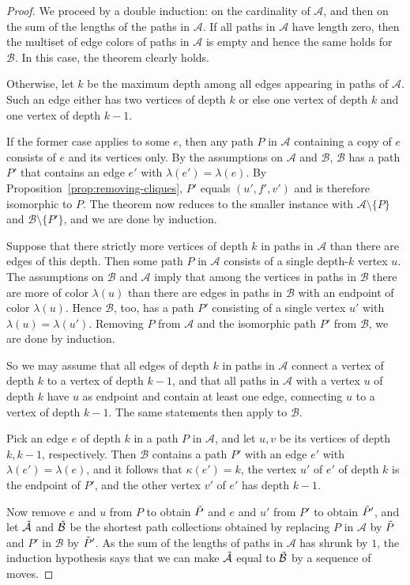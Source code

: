 \documentclass[10pt,a4paper]{amsart}
\newcommand{\cA}{\mathcal{A}}
\newcommand{\cB}{\mathcal{B}}
\begin{document}
\begin{proof}
We proceed by a double induction: on the cardinality of $\cA$, and then
on the sum of the lengths of the paths in $\cA$.  If all paths in $\cA$
have length zero, then the multiset of edge colors of paths in $\cA$
is empty and hence the same holds for $\cB$. In this case, the theorem
clearly holds. 

Otherwise, let $k$ be the maximum depth among all edges appearing in
paths of $\cA$. Such an edge either has two vertices of depth $k$ or
else one vertex of depth $k$ and one vertex of depth $k-1$.

If the former case applies to some $e$, then any path $P$ in
$\cA$ containing a copy of $e$ consists of $e$ and its vertices
only. By the assumptions on $\cA$ and $\cB$, $\cB$ has a path
$P'$ that contains an edge $e'$ with $\lambda(e')=\lambda(e)$. By
Proposition~\ref{prop:removing-cliques}, $P'$ equals $(u',f',v')$ and
is therefore isomorphic to $P$. The theorem now reduces to the smaller
instance with $\cA \setminus \{P\}$ and $\cB \setminus \{P'\}$, and we
are done by induction.

Suppose that there strictly more vertices of depth $k$ in paths in $\cA$
than there are edges of this depth. Then some path $P$ in $\cA$ consists
of a single depth-$k$ vertex $u$. The assumptions on $\cB$ and $\cA$
imply that among the vertices in paths in $\cB$ there are more of color
$\lambda(u)$ than there are edges in paths in $\cB$ with an endpoint of
color $\lambda(u)$. Hence $\cB$, too, has a path $P'$ consisting of a
single vertex $u'$ with $\lambda(u)=\lambda(u')$. Removing $P$ from $\cA$
and the isomorphic path $P'$ from $\cB$, we are done by induction.

So we may assume that all edges of depth $k$ in paths in $\cA$ connect
a vertex of depth $k$ to a vertex of depth $k-1$, and that all paths in
$\cA$ with a vertex $u$ of depth $k$ have $u$ as endpoint and contain
at least one edge, connecting $u$ to a vertex of depth $k-1$. The same
statements then apply to $\cB$. 

Pick an edge $e$ of depth $k$ in a path $P$ in $\cA$, and let $u,v$
be its vertices of depth $k,k-1$, respectively. Then $\cB$ contains
a path $P'$ with an edge $e'$ with $\lambda(e')=\lambda(e)$, and it
follows that $\kappa(e')=k$, the vertex $u'$ of $e'$ of depth $k$ is
the endpoint of $P'$, and the other vertex $v'$ of $e'$ has depth $k-1$.

Now remove $e$ and $u$ from $P$ to obtain $\Tilde{P}$ and $e$ and $u'$
from $P'$ to obtain $\Tilde{P}'$, and let $\Tilde{\cA}$ and $\Tilde{\cB}$
be the shortest path collections obtained by replacing $P$ in $\cA$
by $\Tilde{P}$ and $P'$ in $\cB$ by $\Tilde{P}'$. As the sum of the
lengths of paths in $\cA$ has shrunk by $1$, the induction
hypothesis says that we can make $\Tilde{\cA}$ equal to $\Tilde{\cB}$ by a sequence
of moves.


\end{proof}
\end{document}
